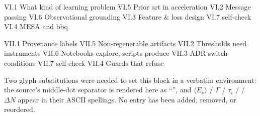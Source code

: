 \begin{srclisting}
VI.1 What kind of learning problem         VI.5 Prior art in acceleration
VI.2 Message passing                       VI.6 Observational grounding
VI.3 Feature & loss design                 VI.7 self-check
VI.4 MESA and bbq

VII.1 Provenance labels                    VII.5 Non-regenerable artifacts
VII.2 Thresholds need instruments          VII.6 Notebooks explore, scripts produce
VII.3 ADR switch conditions                VII.7 self-check
VII.4 Guards that refuse
\end{srclisting}

\begin{aside}
Two glyph substitutions were needed to set this block in a verbatim environment:
the source's middle-dot separator is rendered here as ``'', and
$\langle E_\nu\rangle$ / $\Gamma$ / $\tau_i$ / \Ye{} / $\Delta N$ appear in
their ASCII spellings. No entry has been added, removed, or reordered.
\end{aside}
